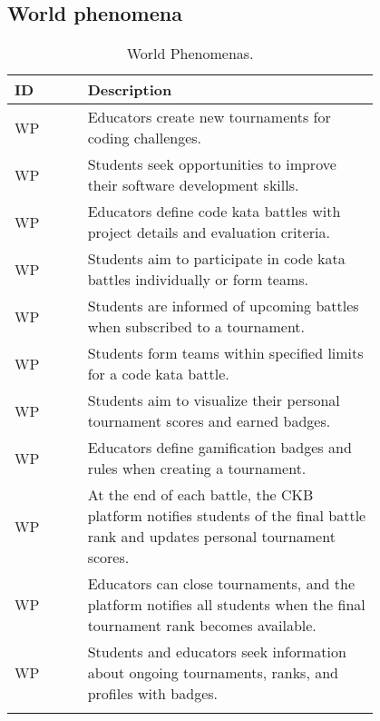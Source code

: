 \subsection{World phenomena}
\label{subsec:world_phenomena}%
\setcounter{wp}{1}
\newcommand{\cwp}{\thewp\stepcounter{wp}}
\begin{center}
    \begin{longtable}{ |l|p{0.8\linewidth}| }
        \hline
        \textbf{ID} & \textbf{Description}                                                \\
        \hline
        WP\cwp      & Educators create new tournaments for coding challenges.                          \\
        \hline
        WP\cwp      & Students seek opportunities to improve their software development skills.   \\
        \hline
        WP\cwp      & Educators define code kata battles with project details and evaluation criteria. \\
        \hline
        WP\cwp      & Students aim to participate in code kata battles individually or form teams.          \\
        \hline
        WP\cwp      & Students are informed of upcoming battles when subscribed to a tournament.                \\
        \hline
        WP\cwp      & Students form teams within specified limits for a code kata battle.                 \\
        \hline
        WP\cwp      & Students aim to visualize their personal tournament scores and earned badges.         \\
        \hline
        WP\cwp      & Educators define gamification badges and rules when creating a tournament.      \\
        \hline
        WP\cwp      & At the end of each battle, the CKB platform notifies students of the final battle rank and updates personal tournament scores.                       \\
        \hline
        WP\cwp      & Educators can close tournaments, and the platform notifies all students when the final tournament rank becomes available. \\
        \hline
        WP\cwp      & Students and educators seek information about ongoing tournaments, ranks, and profiles with badges.                      \\
        \hline
        \caption{World Phenomenas.}
        \label{tab:worldph_tab}%
    \end{longtable}
\end{center}

